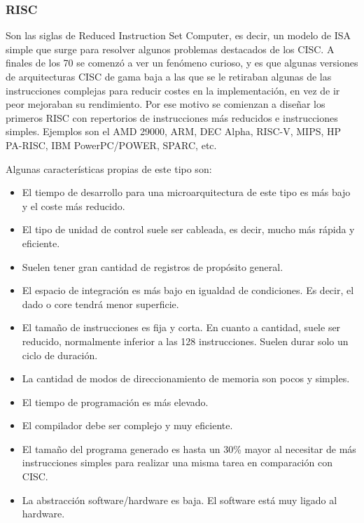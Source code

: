 \documentclass[a4paper, 11pt, titlepage]{article}
\begin{document}
        \subsubsection{RISC}\label{risc}
        
            Son las siglas de Reduced Instruction Set Computer, es decir, un modelo de 
            ISA simple que surge para resolver algunos problemas destacados de los CISC. A finales de los 70 
            se comenzó a ver un fenómeno curioso, y es que algunas versiones de arquitecturas CISC de gama 
            baja a las que se le retiraban algunas de las instrucciones complejas para reducir costes en la 
            implementación, en vez de ir peor mejoraban su rendimiento. Por ese motivo se comienzan a diseñar 
            los primeros RISC con repertorios de instrucciones más reducidos e instrucciones simples. 
            Ejemplos son el AMD 29000, ARM, DEC Alpha, RISC-V, MIPS, HP PA-RISC, IBM PowerPC/POWER, SPARC, 
            etc.

            Algunas características propias de este tipo son:

            \begin{itemize}
                \item El tiempo de desarrollo para una microarquitectura de este tipo es más bajo y el coste más reducido.
                \item El tipo de unidad de control suele ser cableada, es decir, mucho más rápida y eficiente.
                \item Suelen tener gran cantidad de registros de propósito general.
                \item El espacio de integración es más bajo en igualdad de condiciones. Es decir, el dado o core tendrá 
                menor superficie.
                \item El tamaño de instrucciones es fija y corta. En cuanto a cantidad, suele ser reducido, normalmente 
                inferior a las 128 instrucciones. Suelen durar solo un ciclo de duración.
                \item La cantidad de modos de direccionamiento de memoria son pocos y simples.
                \item El tiempo de programación es más elevado.
                \item El compilador debe ser complejo y muy eficiente.
                \item El tamaño del programa generado es hasta un 30\% mayor al necesitar de más instrucciones 
                simples para realizar una misma tarea en comparación con CISC.
                \item La abstracción software/hardware es baja. El software está muy ligado al hardware.
            \end{itemize}
\end{document}
